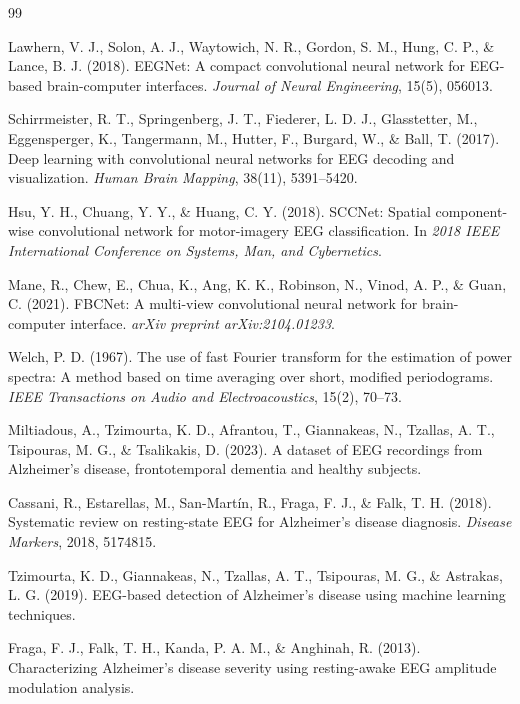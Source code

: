 \documentclass[12pt,a4paper]{article}
\begin{document}
\begin{thebibliography}{99}

Lawhern, V. J., Solon, A. J., Waytowich, N. R., Gordon, S. M., Hung, C. P., \& Lance, B. J. (2018). EEGNet: A compact convolutional neural network for EEG-based brain-computer interfaces. \textit{Journal of Neural Engineering}, 15(5), 056013.

Schirrmeister, R. T., Springenberg, J. T., Fiederer, L. D. J., Glasstetter, M., Eggensperger, K., Tangermann, M., Hutter, F., Burgard, W., \& Ball, T. (2017). Deep learning with convolutional neural networks for EEG decoding and visualization. \textit{Human Brain Mapping}, 38(11), 5391--5420.

Hsu, Y. H., Chuang, Y. Y., \& Huang, C. Y. (2018). SCCNet: Spatial component-wise convolutional network for motor-imagery EEG classification. In \textit{2018 IEEE International Conference on Systems, Man, and Cybernetics}.

Mane, R., Chew, E., Chua, K., Ang, K. K., Robinson, N., Vinod, A. P., \& Guan, C. (2021). FBCNet: A multi-view convolutional neural network for brain-computer interface. \textit{arXiv preprint arXiv:2104.01233}.

Welch, P. D. (1967). The use of fast Fourier transform for the estimation of power spectra: A method based on time averaging over short, modified periodograms. \textit{IEEE Transactions on Audio and Electroacoustics}, 15(2), 70--73.

Miltiadous, A., Tzimourta, K. D., Afrantou, T., Giannakeas, N., Tzallas, A. T., Tsipouras, M. G., \& Tsalikakis, D. (2023). A dataset of EEG recordings from Alzheimer’s disease, frontotemporal dementia and healthy subjects.

Cassani, R., Estarellas, M., San-Martín, R., Fraga, F. J., \& Falk, T. H. (2018). Systematic review on resting-state EEG for Alzheimer’s disease diagnosis. \textit{Disease Markers}, 2018, 5174815.

Tzimourta, K. D., Giannakeas, N., Tzallas, A. T., Tsipouras, M. G., \& Astrakas, L. G. (2019). EEG-based detection of Alzheimer’s disease using machine learning techniques.

Fraga, F. J., Falk, T. H., Kanda, P. A. M., \& Anghinah, R. (2013). Characterizing Alzheimer’s disease severity using resting-awake EEG amplitude modulation analysis.


\end{thebibliography}
\end{document}

